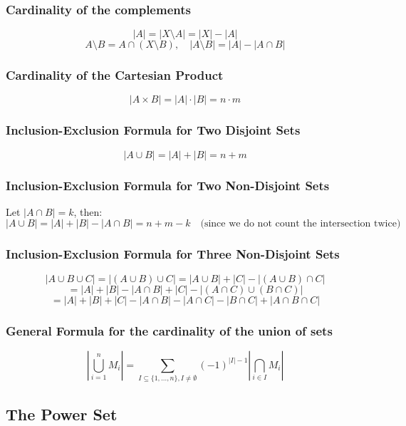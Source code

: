 \subsubsection{Cardinality of the complements}
\[
	|A| = |X \setminus A| = |X| - |A|
\]
\[
	A \setminus B = A \cap (X \setminus B), \quad |A \setminus B| = |A| - |A \cap B|
\]

\subsubsection{Cardinality of the Cartesian Product}
\[
	|A \times B| = |A| \cdot |B| = n \cdot m
\]

\subsubsection{Inclusion-Exclusion Formula for Two Disjoint Sets}
\[
	|A \cup B| = |A| + |B| = n + m
\]

\subsubsection{Inclusion-Exclusion Formula for Two Non-Disjoint Sets}
Let \( |A \cap B| = k \), then:
\[
	|A \cup B| = |A| + |B| - |A \cap B| = n + m - k \quad \text{(since we do not count the intersection twice)}
\]

\subsubsection{Inclusion-Exclusion Formula for Three Non-Disjoint Sets}
\[
	|A \cup B \cup C| = |(A \cup B) \cup C| = |A \cup B| + |C| - |(A \cup B) \cap C|
\]
\[
	= |A| + |B| - |A \cap B| + |C| - |(A \cap C) \cup (B \cap C)|
\]
\[
	= |A| + |B| + |C| - |A \cap B| - |A \cap C| - |B \cap C| + |A \cap B \cap C|
\]

\subsubsection{General Formula for the cardinality of the union of sets}

\[
	\left\vert \bigcup_{i = 1}^n M_i \right\vert  = \sum_{I \subseteq \{1, \dots, n\}, I \neq \emptyset}{(-1)}^{|I| - 1} \left\vert \bigcap_{i \in I} M_i \right\vert
\]

\subsection{The Power Set}


